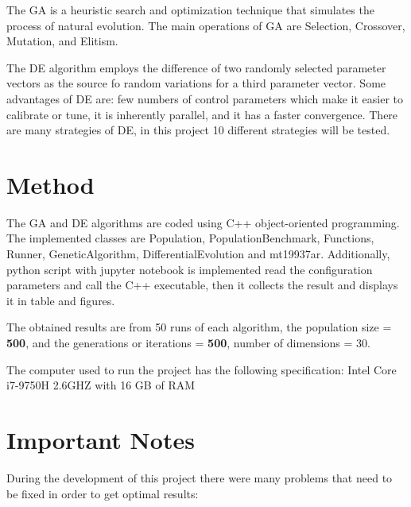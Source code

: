 \documentclass[12pt]{article}
\begin{document}
    The GA is a heuristic search and optimization technique that simulates the process of natural evolution. The main operations of GA are Selection, Crossover, Mutation, and Elitism.
    
    The DE algorithm employs the difference of two randomly selected parameter vectors as the source fo random variations for a third parameter vector. Some advantages of DE are: few numbers of control parameters which make it easier to calibrate or tune, it is inherently parallel, and it has a faster convergence. 
    There are many strategies of DE, in this project 10 different strategies will be tested.
     


    
    \section{Method}
    
    The GA and DE algorithms are coded using C++ object-oriented programming. The implemented classes are Population, PopulationBenchmark,  Functions, Runner, GeneticAlgorithm, DifferentialEvolution and mt19937ar. Additionally,
    python script with jupyter notebook is implemented read the configuration parameters and call the C++ executable, then it collects the result and displays it in table and figures.
    
    The obtained results are from 50 runs of each algorithm, the population size = \textbf{500}, and the generations or iterations = \textbf{500}, number of dimensions = 30.

The computer used to run the project has the following specification: Intel Core i7-9750H 2.6GHZ with 16 GB of RAM

  
      
    



\section{Important Notes}

During the development of this project there were many problems that need to be fixed in order to get optimal results:
\end{document}
